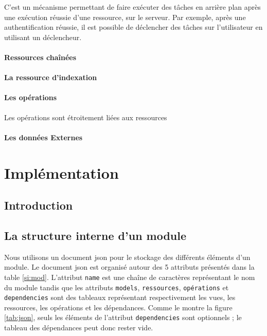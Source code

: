 \documentclass[a4paper,11pt]{report}
\begin{document}
C'est un mécanisme permettant de faire exécuter des tâches en arrière plan 
après une exécution réussie d'une ressource, sur le serveur. Par exemple,
après une authentification réussie, il est possible de déclencher des tâches sur 
l'utilisateur en utilisant un déclencheur.


\subsubsection{Ressources chaînées}
\subsubsection{La ressource d'indexation}


\subsubsection{Les opérations}
Les opérations sont étroitement liées aux ressources

\subsubsection{Les données Externes}%


\chapter{Implémentation}

\section{Introduction}

\section{La structure interne d'un module}

Nous utilisons un document json pour le stockage des différents éléments d'un module.
Le document json est organisé autour des 5 attributs  présentés dans la table \ref{si:mod}.
L'attribut {\tt name} est une chaîne de caractères représentant  le nom du module tandis que
les attributs {\tt models},{ \tt ressources}, {\tt opérations} et {\tt dependencies} sont des tableaux 
représentant respectivement les  vues,  les ressources, les opérations et les dépendances. Comme 
le montre la figure \ref{tab:json}, seuls les éléments de l'attribut {\tt dependencies} sont optionnels ; 
le tableau des dépendances peut donc rester vide.
\end{document}
